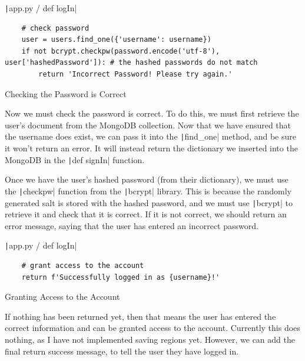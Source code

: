 \documentclass[12pt]{report}
\newcommand{\pil}[1]{\protect\texttt|#1|}
\begin{document}
\begin{listing}[H]
\pil{app.py / def logIn}
\begin{verbatim}
    # check password
    user = users.find_one({'username': username})
    if not bcrypt.checkpw(password.encode('utf-8'), user['hashedPassword']): # the hashed passwords do not match
        return 'Incorrect Password! Please try again.'
\end{verbatim}
\caption{Checking the Password is Correct}\label{cs:correctPassword}
\end{listing}

Now we must check the password is correct. To do this, we must first retrieve the user's document from the MongoDB collection. Now that we have ensured that the username does exist, we can pass it into the \pil{find_one} method, and be sure it won't return an error. It will instead return the dictionary we inserted into the MongoDB in the \pil{def signIn} function.

Once we have the user's hashed password (from their dictionary), we must use the \pil{checkpw} function from the \pil{bcrypt} library. This is because the randomly generated salt is stored with the hashed password, and we must use \pil{bcrypt} to retrieve it and check that it is correct. If it is not correct, we should return an error message, saying that the user has entered an incorrect password.

\begin{listing}[H]
\pil{app.py / def logIn}
\begin{verbatim}
    # grant access to the account
    return f'Successfully logged in as {username}!'
\end{verbatim}
\caption{Granting Access to the Account}\label{cs:grantAccessToAccount}
\end{listing}

If nothing has been returned yet, then that means the user has entered the correct information and can be granted access to the account. Currently this does nothing, as I have not implemented saving regions yet. However, we can add the final return success message, to tell the user they have logged in.
\end{document}
